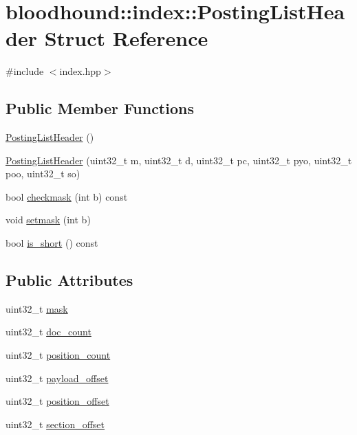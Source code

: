 \hypertarget{structbloodhound_1_1index_1_1PostingListHeader}{}\section{bloodhound\+:\+:index\+:\+:Posting\+List\+Header Struct Reference}
\label{structbloodhound_1_1index_1_1PostingListHeader}


{\ttfamily \#include $<$index.\+hpp$>$}

\subsection*{Public Member Functions}
\begin{DoxyCompactItemize}
\item 
\mbox{\hyperlink{structbloodhound_1_1index_1_1PostingListHeader_a839dc96a649a6a5b381b4e9b93b6e59e}{Posting\+List\+Header}} ()
\item 
\mbox{\hyperlink{structbloodhound_1_1index_1_1PostingListHeader_a9aec6f6c7099b8ea249dc8af709c2125}{Posting\+List\+Header}} (uint32\+\_\+t m, uint32\+\_\+t d, uint32\+\_\+t pc, uint32\+\_\+t pyo, uint32\+\_\+t poo, uint32\+\_\+t so)
\item 
bool \mbox{\hyperlink{structbloodhound_1_1index_1_1PostingListHeader_a4202dde165e19c7dceec520a19d753e9}{checkmask}} (int b) const
\item 
void \mbox{\hyperlink{structbloodhound_1_1index_1_1PostingListHeader_ab9bb3cd3201527041e86a7fec0bd385d}{setmask}} (int b)
\item 
bool \mbox{\hyperlink{structbloodhound_1_1index_1_1PostingListHeader_acf8fd2592a71083d37bb7bb58fc8c544}{is\+\_\+short}} () const
\end{DoxyCompactItemize}
\subsection*{Public Attributes}
\begin{DoxyCompactItemize}
\item 
uint32\+\_\+t \mbox{\hyperlink{structbloodhound_1_1index_1_1PostingListHeader_a18fbb5f0675f6e59844b599950809bb0}{mask}}
\item 
uint32\+\_\+t \mbox{\hyperlink{structbloodhound_1_1index_1_1PostingListHeader_ac22a6d1974badac6cbedfb69f9c9bf5c}{doc\+\_\+count}}
\item 
uint32\+\_\+t \mbox{\hyperlink{structbloodhound_1_1index_1_1PostingListHeader_a88360105ba2e46000621f5bb74b4269c}{position\+\_\+count}}
\item 
uint32\+\_\+t \mbox{\hyperlink{structbloodhound_1_1index_1_1PostingListHeader_ab4ff4ee2a0aa56e03d315f6e60adf345}{payload\+\_\+offset}}
\item 
uint32\+\_\+t \mbox{\hyperlink{structbloodhound_1_1index_1_1PostingListHeader_a656267fe79315c04f431f99c1c826fec}{position\+\_\+offset}}
\item 
uint32\+\_\+t \mbox{\hyperlink{structbloodhound_1_1index_1_1PostingListHeader_a0c073440a09f22e0e277d3935d6b9158}{section\+\_\+offset}}
\end{DoxyCompactItemize}


